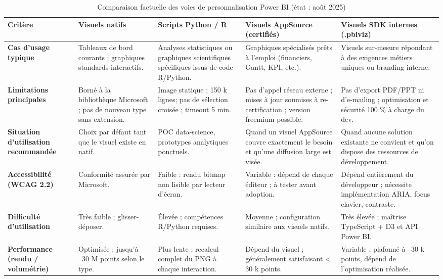 \begin{sidewaystable}[p]
\footnotesize
\centering
\caption{Comparaison factuelle des voies de personnalisation Power BI (état : août 2025)}
\label{tab:comparaison-approches}
\begin{tabularx}{\linewidth}{>{\raggedright\arraybackslash\bfseries}p{2.9cm}XXXX}
\toprule
\textbf{Critère} &
\textbf{Visuels natifs} &
\textbf{Scripts Python / R} &
\textbf{Visuels AppSource (certifiés)} &
\textbf{Visuels SDK internes (.pbiviz)} \\
\midrule
Cas d’usage typique &
Tableaux de bord courants ; graphiques standards interactifs. &
Analyses statistiques ou graphiques scientifiques spécifiques issus de code R/Python. &
Graphiques spécialisés prêts à l’emploi (financiers, Gantt, KPI, etc.). &
Visuels sur-mesure répondant à des exigences métiers uniques ou branding interne.\\[0.4em]

Limitations principales &
Borné à la bibliothèque Microsoft ; pas de nouveau type sans extension. &
Image statique ; 150 k lignes; pas de sélection croisée ; timeout 5 min. &
Pas d’appel réseau externe ; mises à jour soumises à re-certification ; version freemium possible. &
Pas d’export PDF/PPT ni d’e-mailing ; optimisation et sécurité 100 \% à charge du dev.\\[0.4em]

Situation d’utilisation recommandée &
Choix par défaut tant que le visuel existe en natif. &
POC data-science, prototypes analytiques ponctuels. &
Quand un visuel AppSource couvre exactement le besoin et qu’une diffusion large est visée. &
Quand aucune solution existante ne convient et qu’on dispose des ressources de développement.\\[0.4em]

Accessibilité (WCAG 2.2) &
Conformité assurée par Microsoft. &
Faible : rendu bitmap non lisible par lecteur d’écran. &
Variable : dépend de chaque éditeur ; à tester avant adoption. &
Dépend entièrement du développeur ; nécessite implémentation ARIA, focus clavier, contraste.\\[0.4em]

Difficulté d’utilisation &
Très faible ; glisser-déposer. &
Élevée ; compétences R/Python requises. &
Moyenne ; configuration similaire aux visuels natifs. &
Très élevée ; maîtrise TypeScript + D3 et API Power BI.\\[0.4em]

Performance (rendu / volumétrie) &
Optimisée ; jusqu’à ~30 M points selon le type. &
Plus lente ; recalcul complet du PNG à chaque interaction. &
Dépend du visuel ; généralement satisfaisant < 30 k points. &
Variable ; plafonné à ~30 k points, dépend de l’optimisation réalisée.\\[0.4em]


\end{tabularx}
\end{sidewaystable}
